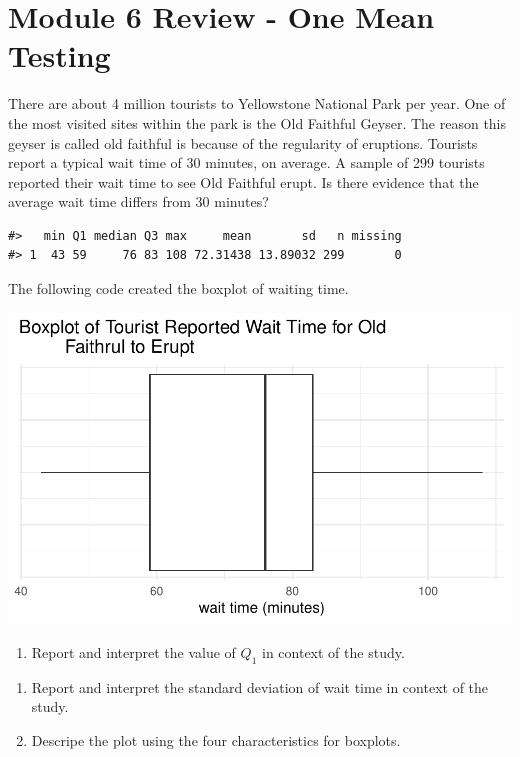 \documentclass[
]{report}
\providecommand{\tightlist}{%
  \setlength{\itemsep}{0pt}\setlength{\parskip}{0pt}}
\begin{document}
\newpage

\section{Module 6 Review - One Mean Testing}\label{module-6-review---one-mean-testing}

There are about 4 million tourists to Yellowstone National Park per year. One of the most visited sites within the park is the Old Faithful Geyser. The reason this geyser is called old faithful is because of the regularity of eruptions. Tourists report a typical wait time of 30 minutes, on average. A sample of 299 tourists reported their wait time to see Old Faithful erupt. Is there evidence that the average wait time differs from 30 minutes?

\begin{verbatim}
#>   min Q1 median Q3 max     mean       sd   n missing
#> 1  43 59     76 83 108 72.31438 13.89032 299       0
\end{verbatim}

The following code created the boxplot of waiting time.

\begin{center}\includegraphics[width=0.6\linewidth]{10-UR-module6_review_files/figure-latex/unnamed-chunk-2-1} \end{center}

\begin{enumerate}
\def\labelenumi{\arabic{enumi}.}
\tightlist
\item
  Report and interpret the value of \(Q_1\) in context of the study.
\end{enumerate}

\vspace{0.5in}

\begin{enumerate}
\def\labelenumi{\arabic{enumi}.}
\setcounter{enumi}{1}
\item
  Report and interpret the standard deviation of wait time in context of the study.
  \vspace{0.2in}
\item
  Descripe the plot using the four characteristics for boxplots.
\end{enumerate}
\end{document}
